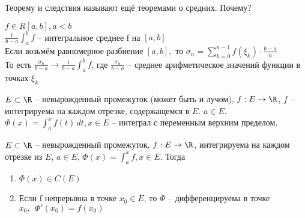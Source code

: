 \begin{Rem}
	Теорему и следствия называют ещё теоремами о средних. Почему?
\end{Rem}

\begin{Def}  
	$f \in R[a, b], a<b$\\
	$\displaystyle \frac{1}{b-a} \int_{a}^{b} f$ -- интегральное среднее f на $[a, b]$\\ 
	Если возьмём равномерное разбиение $[a, b],$ то $\displaystyle \sigma_n =\sum_{k=0}^{n-1} f(\xi_k) \cdot \frac{b-a}{n}$\\
	То есть $\displaystyle \frac{\sigma_n}{b-a} \to \frac{1}{b-a} \int_{a}^{b} f$, где $\displaystyle \frac{\sigma_n}{b-a}$ -- среднее арифметическое значений функции в точках $\xi_k$ 
\end{Def}

\begin{Def} 
	$E \subset \R$ -- невырожденный промежуток (может быть и лучом), $f: E \to \R$, $f$ -- интегрируема на 
	каждом отрезке, содержащемся в $E$. $a \in E$.\\
	$\displaystyle \Phi(x) = \int_{a}^{x} f(t)\,dt, x \in E$ -- интеграл с переменным верхним пределом.
\end{Def} 

\begin{Thm} 
	$E \subset \R$ -- невырожденный промежуток, $f: E \to \R$, интегрируема на каждом отрезке из $E$, $a \in E$,
	$\displaystyle \Phi(x) = \int_{a}^{x} f, x\in E$. Тогда
	\begin{enumerate}
		\item $\Phi(x) \in C(E)$
		\item Если f непрерывна в точке $x_0 \in E$, то $\Phi$ -- дифференцируема в точке $x_0, \ \ \Phi'(x_0) = 
		f(x_0)$
	\end{enumerate}
\end{Thm} 


